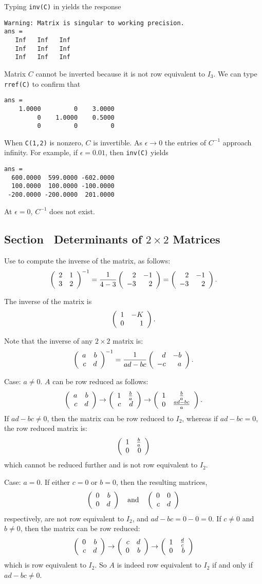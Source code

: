 \documentclass{ximera}
\begin{document}
Typing {\tt inv(C)} in \Matlab yields the response
\begin{verbatim}
Warning: Matrix is singular to working precision.
ans =
   Inf   Inf   Inf
   Inf   Inf   Inf
   Inf   Inf   Inf
\end{verbatim}
Matrix $C$ cannot be inverted because it is not row equivalent to $I_3$.
We can type {\tt rref(C)} to confirm that
\begin{verbatim}
ans =
    1.0000         0    3.0000
         0    1.0000    0.5000
         0         0         0
\end{verbatim}
\para When {\tt C(1,2)} is nonzero, $C$ is invertible.  As $\epsilon
\rightarrow 0$ the entries of $C^{-1}$ approach infinity.  For example,
if $\epsilon = 0.01$, then {\tt inv(C)} yields
\begin{verbatim}
ans =
  600.0000  599.0000 -602.0000
  100.0000  100.0000 -100.0000
 -200.0000 -200.0000  201.0000
\end{verbatim}
At $\epsilon = 0$, $C^{-1}$ does not exist.


\subsection*{Section~\protect{\ref{S:det2x2}} Determinants of $2\times 2$ Matrices}

Use  to compute the inverse of the matrix,
as follows:
\[ \left(\begin{array}{rr} 2 & 1\\ 3 &2\end{array}\right)^{-1} = \frac{1}{4-3}\left(\begin{array}{rr} 2 & -1\\ -3 &2\end{array}\right)
= \left(\begin{array}{rr} 2 & -1\\ -3 &2\end{array}\right). \]

\ans The inverse of the matrix is
\[
\left(\begin{array}{rr} 1 & -K\\ 0 &1\end{array}\right).
\]

\soln Note that the inverse of any $2 \times 2$ matrix is:
\[ \left(\begin{array}{rr} a & b\\ c &d\end{array}\right)^{-1} = \frac{1}{ad - bc}\left(\begin{array}{rr} d & -b\\ -c &a\end{array}\right). \]


Case: $a \neq 0$.  $A$ can be row reduced as follows:
\[ \left(\begin{array}{rr} a & b\\ c &d\end{array}\right) \rightarrow
\left(\begin{array}{rr} 1 & \frac{b}{a}\\ c &d\end{array}\right) \rightarrow
\left(\begin{array}{cc} 1 & \frac{b}{a}\\ 0 &\frac{ad - bc}{a}\end{array}\right). \]
If $ad - bc \neq 0$, then the matrix can be row reduced to $I_2$, whereas
if $ad - bc = 0$, the row reduced matrix is:
\[ \left(\begin{array}{rr} 1 & \frac{b}{a}\\ 0 &0\end{array}\right) \]
which cannot be reduced further and is not row equivalent to $I_2$.

Case: $a = 0$.  If either $c = 0$ or $b = 0$, then the resulting matrices,
\[ \left(\begin{array}{rr} 0 & b\\ 0 &d\end{array}\right) \quad\mbox{and}\quad \left(\begin{array}{rr} 0 & 0\\ c &d\end{array}\right) \]
respectively, are not row equivalent to $I_2$, and $ad - bc = 0 - 0 = 0$.
If $c \neq 0$ and $b \neq 0$, then the matrix can be row reduced:
\[ \left(\begin{array}{rr} 0 & b\\ c &d\end{array}\right) \rightarrow
\left(\begin{array}{rr} c & d\\ 0 &b\end{array}\right) \rightarrow \left(\begin{array}{rr} 1 & \frac{d}{c}\\ 0 &b\end{array}\right) \]
which is row equivalent to $I_2$.  So $A$ is indeed row equivalent
to $I_2$ if and only if $ad - bc \neq 0$.
\end{document}
